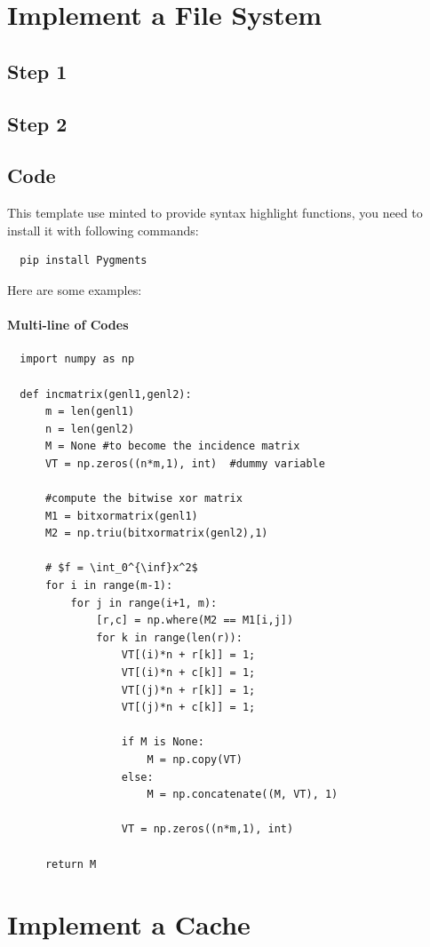 \documentclass[12pt]{article}
\begin{document}
\tableofcontents
\pagebreak

\section{Implement a File System}
\subsection{Step 1}
\subsection{Step 2}
\subsection{Code}
This template use minted to provide syntax highlight functions, you need to install it with following commands:
\begin{verbatim}
  pip install Pygments
\end{verbatim}
Here are some examples:
\paragraph{Multi-line of Codes}
\begin{verbatim}
  import numpy as np

  def incmatrix(genl1,genl2):
      m = len(genl1)
      n = len(genl2)
      M = None #to become the incidence matrix
      VT = np.zeros((n*m,1), int)  #dummy variable

      #compute the bitwise xor matrix
      M1 = bitxormatrix(genl1)
      M2 = np.triu(bitxormatrix(genl2),1)

      # $f = \int_0^{\inf}x^2$
      for i in range(m-1):
          for j in range(i+1, m):
              [r,c] = np.where(M2 == M1[i,j])
              for k in range(len(r)):
                  VT[(i)*n + r[k]] = 1;
                  VT[(i)*n + c[k]] = 1;
                  VT[(j)*n + r[k]] = 1;
                  VT[(j)*n + c[k]] = 1;

                  if M is None:
                      M = np.copy(VT)
                  else:
                      M = np.concatenate((M, VT), 1)

                  VT = np.zeros((n*m,1), int)

      return M
\end{verbatim}
\section{Implement a Cache}
\newpage


\end{document}
